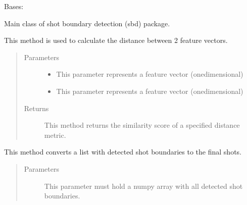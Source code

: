 \documentclass[letterpaper,10pt,english,openany,oneside]{sphinxmanual}
\begin{document}
\begin{fulllineitems}
\label{\detokenize{SBD:sbd.SBD.SBD}}
Bases: 

Main class of shot boundary detection (sbd) package.

\begin{fulllineitems}
\label{\detokenize{SBD:sbd.SBD.SBD.calculateDistance}}
This method is used to calculate the distance between 2 feature vectors.
\begin{quote}\begin{description}
\item[{Parameters}] \leavevmode\begin{itemize}
\item {} 
 \textendash{} This parameter represents a feature vector (one\sphinxhyphen{}dimensional)

\item {} 
 \textendash{} This parameter represents a feature vector (one\sphinxhyphen{}dimensional)

\end{itemize}

\item[{Returns}] \leavevmode
This method returns the similarity score of a specified distance metric.

\end{description}\end{quote}

\end{fulllineitems}


\begin{fulllineitems}
\label{\detokenize{SBD:sbd.SBD.SBD.convertShotBoundaries2Shots}}
This method converts a list with detected shot boundaries to the final shots.
\begin{quote}\begin{description}
\item[{Parameters}] \leavevmode
{} \textendash{} This parameter must hold a numpy array with all detected shot boundaries.


\end{description}
\end{quote}
\end{fulllineitems}
\end{fulllineitems}
\end{document}
